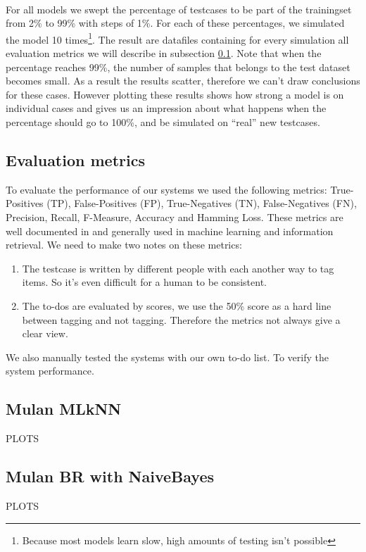 \documentclass[a4paper,titlepage]{article}
\begin{document}
\paragraph{}
For all models we swept the percentage of testcases to be part of the trainingset from 2\% to 99\% with steps of 1\%. For each of these percentages, we simulated the model 10 times\footnote{Because most models learn slow, high amounts of testing isn't possible}. The result are datafiles containing for every simulation all evaluation metrics we will describe in subsection \ref{ss:evalmetrics}. Note that when the percentage reaches 99\%, the number of samples that belongs to the test dataset becomes small. As a result the results scatter, therefore we can't draw conclusions for these cases. However plotting these results shows how strong a model is on individual cases and gives us an impression about what happens when the percentage should go to 100\%, and be simulated on ``real'' new testcases.
\subsection{Evaluation metrics}
\label{ss:evalmetrics}
To evaluate the performance of our systems we used the following metrics: True-Positives (TP), False-Positives (FP), True-Negatives (TN), False-Negatives (FN), Precision, Recall, F-Measure, Accuracy and Hamming Loss. These metrics are well documented in \cite{Francis99performancemeasures} and generally used in machine learning and information retrieval. We need to make two notes on these metrics:
\begin{enumerate}
 \item The testcase is written by different people with each another way to tag items. So it's even difficult for a human to be consistent.
 \item The to-dos are evaluated by scores, we use the 50\% score as a hard line between tagging and not tagging. Therefore the metrics not always give a clear view.
\end{enumerate}
We also manually tested the systems with our own to-do list. To verify the system performance.

\subsection{Mulan MLkNN}
PLOTS

\subsection{Mulan BR with NaiveBayes}
PLOTS
\end{document}

